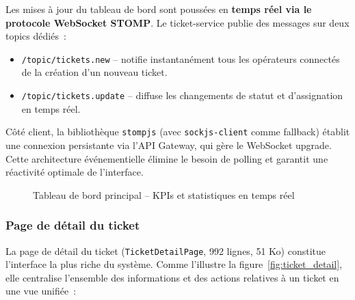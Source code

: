 Les mises \`{a} jour du tableau de bord sont pouss\'{e}es en \textbf{temps r\'{e}el via le protocole WebSocket STOMP}. Le ticket-service publie des messages sur deux topics d\'{e}di\'{e}s~:
\begin{itemize}
    \item \texttt{/topic/tickets.new} -- notifie instantan\'{e}ment tous les op\'{e}rateurs connect\'{e}s de la cr\'{e}ation d'un nouveau ticket.
    \item \texttt{/topic/tickets.update} -- diffuse les changements de statut et d'assignation en temps r\'{e}el.
\end{itemize}
C\^{o}t\'{e} client, la biblioth\`{e}que \texttt{stompjs} (avec \texttt{sockjs-client} comme fallback) \'{e}tablit une connexion persistante via l'API Gateway, qui g\`{e}re le WebSocket upgrade. Cette architecture \'{e}v\'{e}nementielle \'{e}limine le besoin de polling et garantit une r\'{e}activit\'{e} optimale de l'interface.

\begin{figure}[H]
    \centering
    \caption{Tableau de bord principal -- KPIs et statistiques en temps r\'{e}el}
    \label{fig:dashboard}
\end{figure}

\subsubsection{Page de d\'{e}tail du ticket}

La page de d\'{e}tail du ticket (\texttt{TicketDetailPage}, 992 lignes, 51 Ko) constitue l'interface la plus riche du syst\`{e}me. Comme l'illustre la figure~\ref{fig:ticket_detail}, elle centralise l'ensemble des informations et des actions relatives \`{a} un ticket en une vue unifi\'{e}e~:

